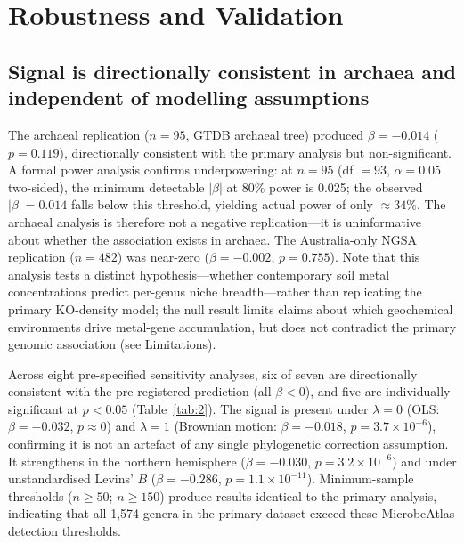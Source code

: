 \documentclass[times]{zHenriquesLab-StyleBioRxiv}
\begin{document}
\section*{Robustness and Validation}
\setcounter{subsection}{0}

\subsection{Signal is directionally consistent in archaea and independent of
modelling assumptions}
\label{ss:archaea}

The archaeal replication ($n = 95$, GTDB archaeal tree) produced
$\beta = -0.014$ ($p = 0.119$), directionally consistent with the primary
analysis but non-significant. A formal power analysis confirms underpowering:
at $n = 95$ (df $= 93$, $\alpha = 0.05$ two-sided), the minimum detectable
$|\beta|$ at 80\% power is 0.025; the observed $|\beta| = 0.014$ falls below
this threshold, yielding actual power of only ${\approx}34\%$. The archaeal
analysis is therefore not a negative replication---it is uninformative about
whether the association exists in archaea. The Australia-only NGSA replication ($n = 482$)
was near-zero ($\beta = -0.002$, $p = 0.755$). Note that this analysis tests a
distinct hypothesis---whether contemporary soil metal concentrations predict
per-genus niche breadth---rather than replicating the primary KO-density model;
the null result limits claims about which geochemical environments drive metal-gene
accumulation, but does not contradict the primary genomic association (see
Limitations).

Across eight pre-specified sensitivity analyses, six of seven are directionally
consistent with the pre-registered prediction (all $\beta < 0$), and five are individually significant at
$p < 0.05$ (Table~\ref{tab:2}). The signal is present under $\lambda = 0$
(OLS: $\beta = -0.032$, $p \approx 0$) and $\lambda = 1$ (Brownian motion:
$\beta = -0.018$, $p = 3.7 \times 10^{-6}$), confirming it is not an artefact
of any single phylogenetic correction assumption. It strengthens in the
northern hemisphere ($\beta = -0.030$, $p = 3.2 \times 10^{-6}$) and
under unstandardised Levins' $B$ ($\beta = -0.286$,
$p = 1.1 \times 10^{-11}$). Minimum-sample thresholds ($n \geq 50$;
$n \geq 150$) produce results identical to the primary analysis, indicating
that all 1,574 genera in the primary dataset exceed these MicrobeAtlas
detection thresholds.
\end{document}
